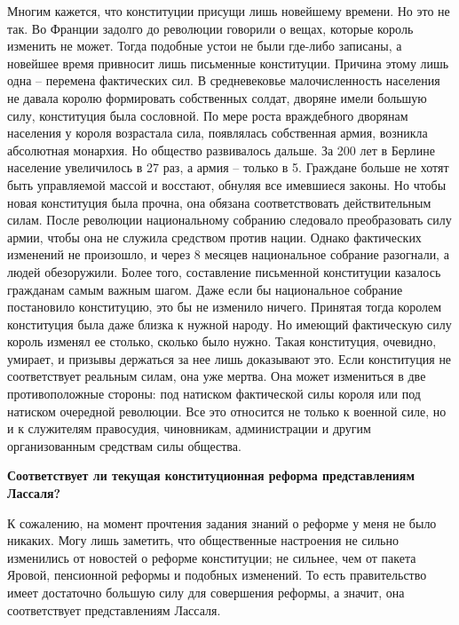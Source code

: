 \documentclass[a4paper, 12pt]{article}
\begin{document}
Многим кажется, что конституции присущи лишь новейшему времени. Но это не так. Во Франции задолго до революции говорили о вещах, которые король изменить не может. 
Тогда подобные устои не были где-либо записаны, а новейшее время привносит лишь письменные конституции. Причина этому лишь одна -- перемена фактических сил. 
В средневековье малочисленность населения не давала королю формировать собственных солдат, дворяне имели большую силу, конституция была сословной. 
По мере роста враждебного дворянам населения у короля возрастала сила, появлялась собственная армия, возникла абсолютная монархия. Но общество развивалось дальше. 
За 200 лет в Берлине население увеличилось в 27 раз, а армия -- только в 5. Граждане больше не хотят быть управляемой массой и восстают, обнуляя все имевшиеся законы. 
Но чтобы новая конституция была прочна, она обязана соответствовать действительным силам. После революции национальному собранию следовало преобразовать силу армии, чтобы она не служила средством против нации. 
Однако фактических изменений не произошло, и через 8 месяцев национальное собрание разогнали, а людей обезоружили. Более того, составление письменной конституции казалось гражданам самым важным шагом. 
Даже если бы национальное собрание постановило конституцию, это бы не изменило ничего. Принятая тогда королем конституция была даже близка к нужной народу. 
Но имеющий фактическую силу король изменял ее столько, сколько было нужно. Такая конституция, очевидно, умирает, и призывы держаться за нее лишь доказывают это. 
Если конституция не соответствует реальным силам, она уже мертва. Она может измениться в две противоположные стороны: под натиском фактической силы короля или под натиском очередной революции. 
Все это относится не только к военной силе, но и к служителям правосудия, чиновникам, администрации и другим организованным средствам силы общества. 



\begin{center}
\bf Соответствует ли текущая конституционная реформа представлениям Лассаля?
\end{center}

К сожалению, на момент прочтения задания знаний о реформе у меня не было никаких. Могу лишь заметить, что общественные настроения не сильно изменились от новостей о реформе конституции; не сильнее, чем от пакета Яровой, пенсионной реформы и подобных изменений. То есть правительство имеет достаточно большую силу для совершения реформы, а значит, она соответствует представлениям Лассаля. 
\end{document}
